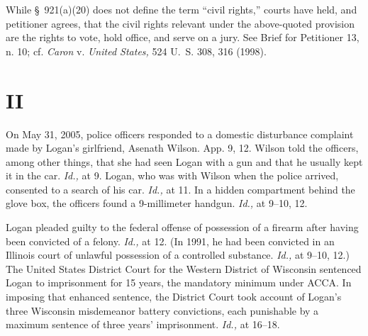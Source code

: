 \noindent While \S~921(a)(20) does not define the term ``civil rights,'' courts have held, and petitioner agrees, that the civil rights relevant under the above-quoted provision are the rights to vote, hold office, and serve on a jury. See Brief for Petitioner 13, n. 10; cf. \emph{Caron} v. \emph{United States,} 524 U.~S. 308, 316 (1998).

\section{II}

  On May 31, 2005, police officers responded to a domestic disturbance complaint made by Logan's girlfriend, Asenath Wilson. App. 9, 12. Wilson told the officers, among other things, that she had seen Logan with a gun and that he usually kept it in the car. \emph{Id.,} at 9. Logan, who was with Wil\newpage son when the police arrived, consented to a search of his car. \emph{Id.,} at 11. In a hidden compartment behind the glove box, the officers found a 9-millimeter handgun. \emph{Id.,} at 9--10, 12.


  Logan pleaded guilty to the federal offense of possession of a firearm after having been convicted of a felony. \emph{Id.,} at 12. (In 1991, he had been convicted in an Illinois court of unlawful possession of a controlled substance. \emph{Id.,} at 9--10, 12.) The United States District Court for the Western District of Wisconsin sentenced Logan to imprisonment for 15 years, the mandatory minimum under ACCA. In imposing that enhanced sentence, the District Court took account of Logan's three Wisconsin misdemeanor battery convictions, each punishable by a maximum sentence of three years' imprisonment. \emph{Id.,} at 16--18.\footnotemark[2]


